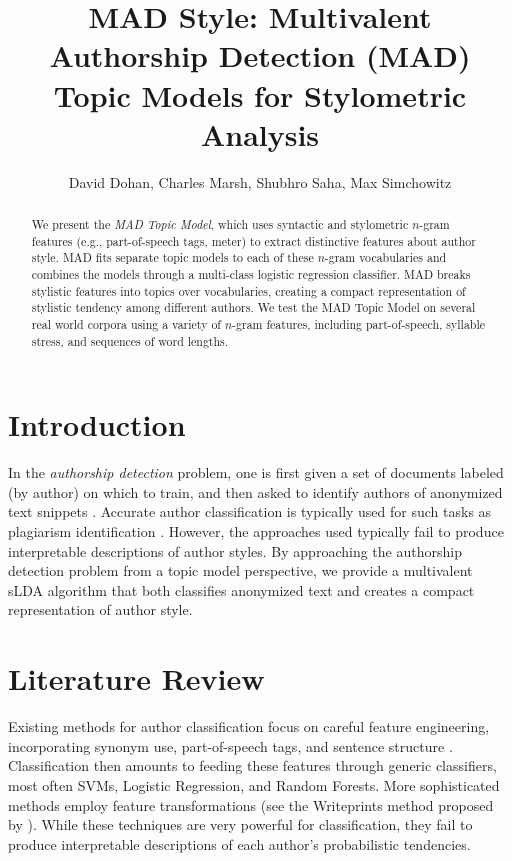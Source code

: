 \documentclass[14pt]{article} %
\title{MAD Style: Multivalent Authorship Detection (MAD) Topic Models for Stylometric Analysis}
\author{David Dohan, Charles Marsh, Shubhro Saha, Max Simchowitz}
\theoremstyle{plain}
\theoremstyle{definition}
\theoremstyle{remark}
\begin{document}
\maketitle
\large
\begin{abstract}
We present the \textit{MAD Topic Model}, which uses  syntactic and stylometric $n$-gram features (e.g., part-of-speech tags, meter) to extract distinctive features about author style. MAD fits separate topic models to each of these $n$-gram vocabularies and combines the models through a multi-class logistic regression classifier. MAD breaks stylistic features into topics over vocabularies, creating a compact representation of stylistic tendency among different authors. We test the MAD Topic Model on several real world corpora using a variety of $n$-gram features, including part-of-speech, syllable stress, and sequences of word lengths.
\end{abstract}

\section{Introduction}

In the \textit{authorship detection} problem, one is first given a set of documents labeled (by author) on which to train, and then asked to identify authors of anonymized text snippets \citep{Stein}. Accurate author classification is typically used for such tasks as plagiarism identification \cite{stamatatos2009intrinsic, Stein}. However, the approaches used typically fail to produce interpretable descriptions of author styles. By approaching the authorship detection problem from a topic model perspective, we provide a multivalent sLDA algorithm that both classifies anonymized text and creates a compact representation of author style.

\section{Literature Review}

Existing methods for author classification focus on careful feature engineering, incorporating synonym use, part-of-speech tags, and sentence structure \cite{stamatatos2009survey}. Classification then amounts to feeding these features through generic classifiers, most often SVMs, Logistic Regression, and Random Forests. More sophisticated methods employ feature transformations (see the Writeprints method proposed by \citet{abbasi2008writeprints}). While these techniques are very powerful for classification, they fail to produce interpretable descriptions of each author's probabilistic tendencies.
\end{document}
